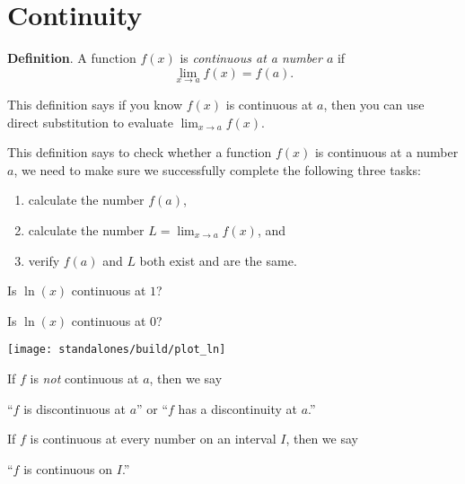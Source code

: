 \documentclass[../main.tex]{subfiles}
\begin{document}

\section{Continuity}

\begin{mdframed}[style=withref]
  \textbf{Definition}. A function \(f(x)\) is \emph{continuous at a number \(a\)} if 
  \[
    {\lim_{x \to a} f(x) = f(a).}
  \]
\end{mdframed}
This definition says if you know \(f(x)\) is {continuous} at \(a\), then you can use {direct substitution} to evaluate \(\lim_{x \to a} f(x)\). 

This definition says to check whether a function \(f(x)\) is continuous at a number \(a\), we need to make sure we successfully complete the following three tasks:
\begin{enumerate}[label=(C\arabic*)]
  \item calculate the number {\(f(a)\),}
  \item calculate the number {\(L = \lim_{x \to a} f(x)\), and} 
  \item verify {\(f(a)\) and \(L\) both exist and are the same.}
\end{enumerate}
\bigskip

\begin{minipage}{.6\textwidth}
\begin{example}
  Is \(\ln(x)\) continuous at \(1\)? 
\end{example}
\vspace{1.5in}

\begin{example}
  Is \(\ln(x)\) continuous at \(0\)? 
\end{example}
\vspace{1in}
\end{minipage}
\hfill\vline\hfill
\begin{minipage}{.35\textwidth}
  \texttt{[image: standalones/build/plot\_ln]}
\end{minipage}

If \(f\) is \emph{not} continuous at \(a\), then we say
\begin{center}
  ``\(f\) is {discontinuous} at \(a\)'' \quad or \quad ``\(f\) has a {discontinuity} at \(a\).''
\end{center}

If \(f\) is continuous at every number on an interval \(I\), then we say 
\begin{center}
  ``\(f\) is continuous on \(I\).''
\end{center}
\bigskip
\end{document}
